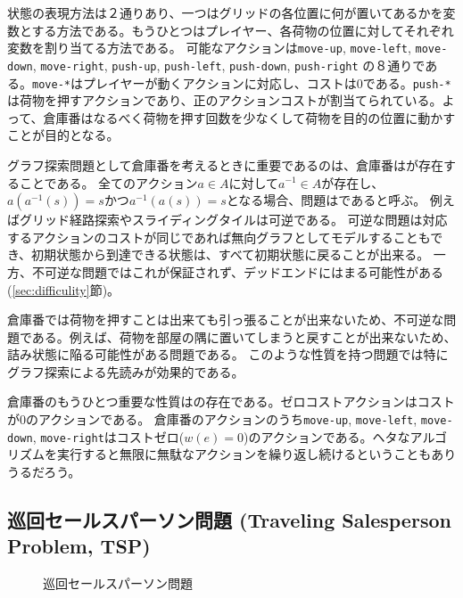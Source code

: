 状態の表現方法は２通りあり、一つはグリッドの各位置に何が置いてあるかを変数とする方法である。もうひとつはプレイヤー、各荷物の位置に対してそれぞれ変数を割り当てる方法である。
可能なアクションは{\tt move-up}, {\tt move-left}, {\tt move-down}, {\tt move-right}, {\tt push-up}, {\tt push-left}, {\tt push-down}, {\tt push-right} の８通りである。{\tt move-*}はプレイヤーが動くアクションに対応し、コストは0である。{\tt push-*}は荷物を押すアクションであり、正のアクションコストが割当てられている。よって、倉庫番はなるべく荷物を押す回数を少なくして荷物を目的の位置に動かすことが目的となる。

グラフ探索問題として倉庫番を考えるときに重要であるのは、倉庫番はが存在することである。
全てのアクション$a \in A$に対して$a^{-1} \in A$が存在し、$a(a^{-1}(s)) = s$かつ$a^{-1}(a(s)) = s$となる場合、問題はであると呼ぶ。
例えばグリッド経路探索やスライディングタイルは可逆である。
可逆な問題は対応するアクションのコストが同じであれば無向グラフとしてモデルすることもでき、初期状態から到達できる状態は、すべて初期状態に戻ることが出来る。
一方、不可逆な問題ではこれが保証されず、デッドエンドにはまる可能性がある (\ref{sec:difficulity}節)。

倉庫番では荷物を押すことは出来ても引っ張ることが出来ないため、不可逆な問題である。例えば、荷物を部屋の隅に置いてしまうと戻すことが出来ないため、詰み状態に陥る可能性がある問題である。
このような性質を持つ問題では特にグラフ探索による先読みが効果的である。

倉庫番のもうひとつ重要な性質はの存在である。ゼロコストアクションはコストが0のアクションである。%
倉庫番のアクションのうち{\tt move-up}, {\tt move-left}, {\tt move-down}, {\tt move-right}はコストゼロ($w(e)=0$)のアクションである。ヘタなアルゴリズムを実行すると無限に無駄なアクションを繰り返し続けるということもありうるだろう。


\subsection{巡回セールスパーソン問題 (Traveling Salesperson Problem, TSP)}

\begin{figure}
\centering
\begin{tikzpicture}[scale=0.7]
  
\end{tikzpicture}
\caption{巡回セールスパーソン問題}
\label{fig:sokoban}
\end{figure}


